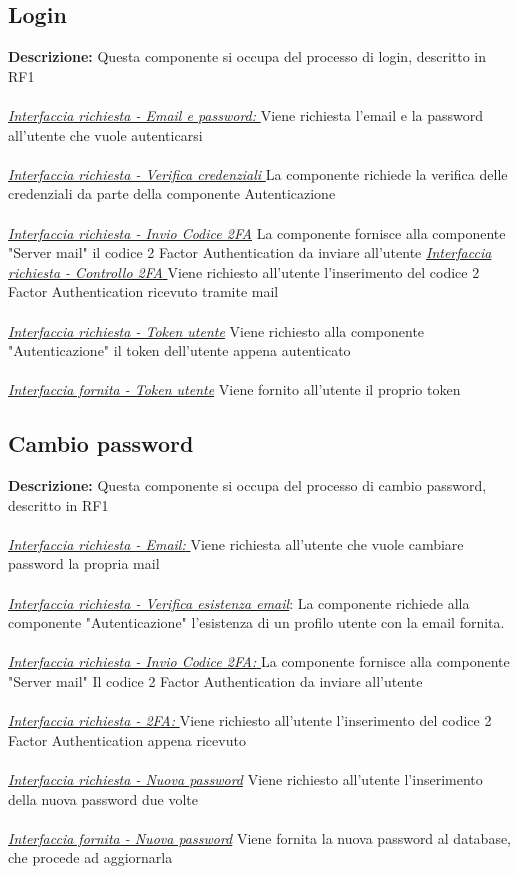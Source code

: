 \documentclass{report}
\begin{document}
\subsection*{Login}
\textbf{Descrizione: }Questa componente si occupa del processo di login, descritto in RF1
\\ \\ \uline{\textit{Interfaccia richiesta - Email e password: }} Viene richiesta l'email e la password all'utente che vuole autenticarsi
\\ \\ \uline{\textit{Interfaccia richiesta - Verifica credenziali }}La componente richiede la verifica delle credenziali da parte della componente Autenticazione
\\ \\ \uline{\textit{Interfaccia richiesta - Invio Codice 2FA}} La componente fornisce alla componente "Server mail" il codice 2 Factor Authentication da inviare all'utente
\uline{\textit{Interfaccia richiesta - Controllo 2FA }} Viene richiesto all'utente l'inserimento del codice 2 Factor Authentication ricevuto tramite mail
\\ \\ \uline{\textit{Interfaccia richiesta - Token utente}} Viene richiesto alla componente "Autenticazione" il token dell'utente appena autenticato
\\ \\ \uline{\textit{Interfaccia fornita - Token utente}} Viene fornito all'utente il proprio token

\subsection*{Cambio password}
\textbf{Descrizione: }Questa componente si occupa del processo di cambio password, descritto in RF1
\\ \\ \uline{\textit{Interfaccia richiesta - Email: }} Viene richiesta all'utente che vuole cambiare password la propria mail
\\ \\ \uline{\textit{Interfaccia richiesta - Verifica esistenza email}}: La componente richiede alla componente "Autenticazione" l'esistenza di un profilo utente con la email fornita.
\\ \\ \uline{\textit{Interfaccia richiesta - Invio Codice 2FA: }} La componente fornisce alla componente "Server mail" Il codice 2 Factor Authentication da inviare all'utente
\\ \\ \uline{\textit{Interfaccia richiesta - 2FA: }} Viene richiesto all'utente l'inserimento del codice 2 Factor Authentication appena ricevuto
\\ \\ \uline{\textit{Interfaccia richiesta - Nuova password}} Viene richiesto all'utente l'inserimento della nuova password due volte
\\ \\ \uline{\textit{Interfaccia fornita - Nuova password}} Viene fornita la nuova password al database, che procede ad aggiornarla
\end{document}
